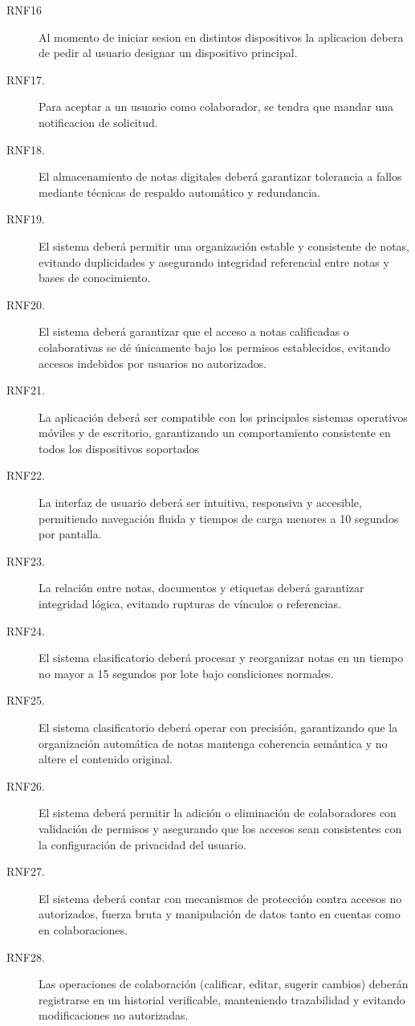 \begin{description}
    \item[RNF16] Al momento de iniciar sesion en distintos dispositivos la aplicacion debera de pedir al usuario designar un dispositivo principal.
    
    \item[RNF17.] Para aceptar a un usuario como colaborador, se tendra que mandar una notificacion de solicitud.
    
    \item[RNF18.] El almacenamiento de notas digitales deberá garantizar tolerancia a fallos mediante técnicas de respaldo automático y redundancia.
    
    \item[RNF19.] El sistema deberá permitir una organización estable y consistente de notas, evitando duplicidades y asegurando integridad referencial entre notas y bases de conocimiento.
    
    \item[RNF20.] El sistema deberá garantizar que el acceso a notas calificadas o colaborativas se dé únicamente bajo los permisos establecidos, evitando accesos indebidos por usuarios no autorizados.
    \item[RNF21.] La aplicación deberá ser compatible con los principales sistemas operativos móviles y de escritorio, garantizando un comportamiento consistente en todos los dispositivos soportados
    \item[RNF22.]La interfaz de usuario deberá ser intuitiva, responsiva y accesible, permitiendo navegación fluida y tiempos de carga menores a 10 segundos por pantalla.  
    \item[RNF23.] La relación entre notas, documentos y etiquetas deberá garantizar integridad lógica, evitando rupturas de vínculos o referencias.
    \item[RNF24.] El sistema clasificatorio deberá procesar y reorganizar notas en un tiempo no mayor a 15 segundos por lote bajo condiciones normales.  
    \item[RNF25.] El sistema clasificatorio deberá operar con precisión, garantizando que la organización automática de notas mantenga coherencia semántica y no altere el contenido original.
    \item[RNF26.] El sistema deberá permitir la adición o eliminación de colaboradores con validación de permisos y asegurando que los accesos sean consistentes con la configuración de privacidad del usuario.
    \item[RNF27.] El sistema deberá contar con mecanismos de protección contra accesos no autorizados, fuerza bruta y manipulación de datos tanto en cuentas como en colaboraciones.
    
    \item[RNF28.] Las operaciones de colaboración (calificar, editar, sugerir cambios) deberán registrarse en un historial verificable, manteniendo trazabilidad y evitando modificaciones no autorizadas.

\end{description}


